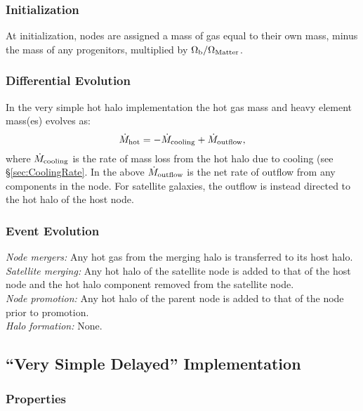 \subsubsection{Initialization}

At initialization, nodes are assigned a mass of gas equal to their own mass, minus the mass of any progenitors, multiplied by $\Omega_{\rm b}/\Omega_{\rm Matter}$.

\subsubsection{Differential Evolution}

In the very simple hot halo implementation the hot gas mass and heavy element mass(es) evolves as:
\begin{equation}
 \dot{M}_{\rm hot} = - \dot{M}_{\rm cooling} + \dot{M}_{\rm outflow},
\end{equation}
where $\dot{M}_{\rm cooling}$ is the rate of mass loss from the hot halo due to cooling (see \S\ref{sec:CoolingRate}.
In the above $\dot{M}_{\rm outflow}$ is the net rate of outflow from any components in the node. For satellite galaxies, the outflow is instead directed to the hot halo of the host \gls{node}.

\subsubsection{Event Evolution}

\noindent\emph{Node mergers:} Any hot gas from the merging halo is transferred to its host halo.\\

\noindent\emph{Satellite merging:} Any hot halo of the satellite \gls{node} is added to that of the host \gls{node} and the hot halo \gls{component} removed from the satellite node.\\

\noindent\emph{Node promotion:} Any hot halo of the parent \gls{node} is added to that of the \gls{node} prior to promotion.\\

\noindent\emph{Halo formation:} None.\\

\subsection{``Very Simple Delayed'' Implementation}

\subsubsection{Properties}

